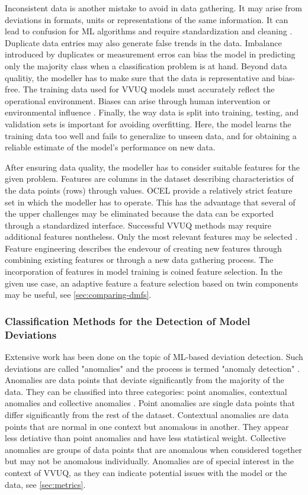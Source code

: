 Inconsistent data is another mistake to avoid in data gathering. It may arise from deviations in formats, units or representations of the same information. It can lead to confusion for ML algorithms and require standardization and cleaning \parencite{mahanthappa2021data}. Duplicate data entries may also generate false trends in the data. Imbalance introduced by duplicates or measurement erros can bias the model in predicting only the majority class when a classification problem is at hand.
Beyond data qualitiy, the modeller has to make sure that the data is representative and bias-free. The training data used for VVUQ models must accurately reflect the operational environment. Biases can arise through human intervention or environmental influence \parencite{liu2020noise}. Finally, the way data is split into training, testing, and validation sets is important for avoiding overfitting. Here, the model learns the training data too well and fails to generalize to unseen data, and for obtaining a reliable estimate of the model's performance on new data.

After ensuring data quality, the modeller has to consider suitable features for the given problem. Features are columns in the dataset describing characteristics of the data points (rows) through values. OCEL provide a relatively strict feature set in which the modeller has to operate. This has the advantage that several of the upper challenges may be eliminated because the data can be exported through a standardized interface. Successful VVUQ methods may require additional features nontheless. Only the most relevant features may be selected \parencite{geron2022hands}. Feature engineering describes the endevour of creating new features through combining existing features or through a new data gathering process. The incorporation of features in model training is coined feature selection. In the given use case, an adaptive feature a feature selection based on twin components may be useful, see \autoref{sec:comparing-dmfs}.

\subsubsection*{Classification Methods for the Detection of Model Deviations}
\label{sec:classification-methods}
Extensive work has been done on the topic of ML-based deviation detection. Such deviations are called "anomalies" and the process is termed "anomaly detection" \parencite{kharitonov2022comparative}. Anomalies are data points that deviate significantly from the majority of the data. They can be classified into three categories: point anomalies, contextual anomalies and collective anomalies \parencite{chandola2009anomaly}. Point anomalies are single data points that differ significantly from the rest of the dataset. Contextual anomalies are data points that are normal in one context but anomalous in another. They appear less detiative than point anomalies and have less statistical weight. Collective anomalies are groups of data points that are anomalous when considered together but may not be anomalous individually. Anomalies are of special interest in the context of VVUQ, as they can indicate potential issues with the model or the data, see \autoref{sec:metrics}.

